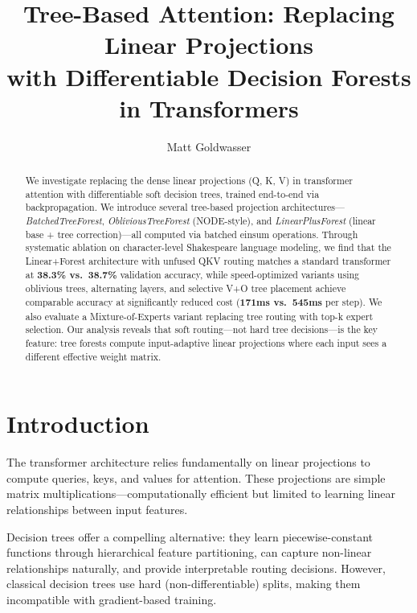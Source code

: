 \documentclass[11pt,a4paper]{article}
\title{Tree-Based Attention: Replacing Linear Projections\\with Differentiable Decision Forests in Transformers}
\author{Matt Goldwasser}
\date{}
\begin{document}
\maketitle

\begin{abstract}
We investigate replacing the dense linear projections (Q, K, V) in transformer attention with differentiable soft decision trees, trained end-to-end via backpropagation. We introduce several tree-based projection architectures---\textit{BatchedTreeForest}, \textit{ObliviousTreeForest} (NODE-style), and \textit{LinearPlusForest} (linear base + tree correction)---all computed via batched einsum operations. Through systematic ablation on character-level Shakespeare language modeling, we find that the Linear+Forest architecture with unfused QKV routing matches a standard transformer at \textbf{38.3\% vs.\ 38.7\%} validation accuracy, while speed-optimized variants using oblivious trees, alternating layers, and selective V+O tree placement achieve comparable accuracy at significantly reduced cost (\textbf{171ms vs.\ 545ms} per step). We also evaluate a Mixture-of-Experts variant replacing tree routing with top-k expert selection. Our analysis reveals that soft routing---not hard tree decisions---is the key feature: tree forests compute input-adaptive linear projections where each input sees a different effective weight matrix.
\end{abstract}

\section{Introduction}

The transformer architecture \citep{vaswani2017attention} relies fundamentally on linear projections to compute queries, keys, and values for attention. These projections are simple matrix multiplications---computationally efficient but limited to learning linear relationships between input features.

Decision trees offer a compelling alternative: they learn piecewise-constant functions through hierarchical feature partitioning, can capture non-linear relationships naturally, and provide interpretable routing decisions. However, classical decision trees use hard (non-differentiable) splits, making them incompatible with gradient-based training.
\end{document}
